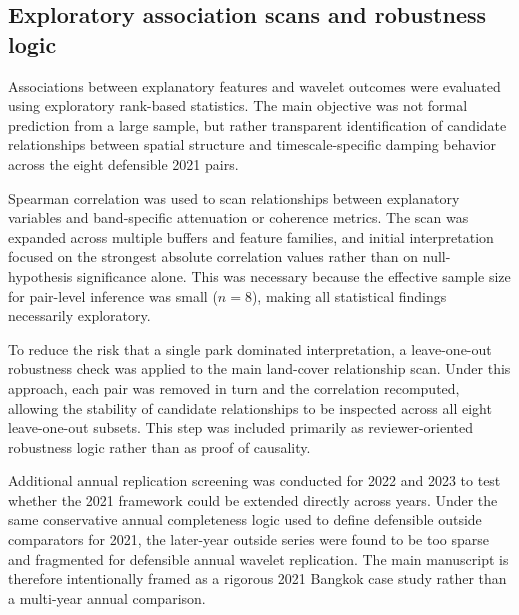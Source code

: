 \subsection{Exploratory association scans and robustness logic}

Associations between explanatory features and wavelet outcomes were evaluated using exploratory rank-based statistics. The main objective was not formal prediction from a large sample, but rather transparent identification of candidate relationships between spatial structure and timescale-specific damping behavior across the eight defensible 2021 pairs.

Spearman correlation was used to scan relationships between explanatory variables and band-specific attenuation or coherence metrics. The scan was expanded across multiple buffers and feature families, and initial interpretation focused on the strongest absolute correlation values rather than on null-hypothesis significance alone. This was necessary because the effective sample size for pair-level inference was small ($n = 8$), making all statistical findings necessarily exploratory.

To reduce the risk that a single park dominated interpretation, a leave-one-out robustness check was applied to the main land-cover relationship scan. Under this approach, each pair was removed in turn and the correlation recomputed, allowing the stability of candidate relationships to be inspected across all eight leave-one-out subsets. This step was included primarily as reviewer-oriented robustness logic rather than as proof of causality.

Additional annual replication screening was conducted for 2022 and 2023 to test whether the 2021 framework could be extended directly across years. Under the same conservative annual completeness logic used to define defensible outside comparators for 2021, the later-year outside series were found to be too sparse and fragmented for defensible annual wavelet replication. The main manuscript is therefore intentionally framed as a rigorous 2021 Bangkok case study rather than a multi-year annual comparison.
